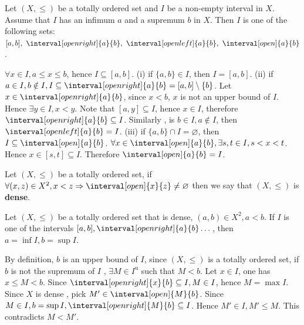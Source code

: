 \begin{propositionenv}
   Let $(X, \le )$ be a totally ordered set and $I $ be a  non-empty interval in $X$. Assume that $I$ has an infimum $a$ and a supremum $b$ in $X$. Then $I$ is one of the following sets:$[a, b], \ \interval[open right]{a}{b}, \ \interval[open left]{a}{b}, \ \interval[open]{a}{b}$.
\end{propositionenv}
\begin{proofenv}
    $\forall x\in I , a\le x\le b $, hence $I\subseteq [a, b]$.
    \newline
    (i) if $\{a, b\}\in I$,  then $I=[a, b]$.
    \newline
    (ii) if $a\in I,  b\notin I, I\subseteq\interval[open right]{a}{b}=[a, b]\setminus\{b\}$. Let $x\in \interval[open right]{a}{b}$,  since $x<b$,  $x$ is not an upper bound of $I$. Hence $\exists y\in I,  x<y$. Note that $[a, y]\subseteq I$,  hence $x\in I$,  therefore $\interval[open right]{a}{b}\subseteq I$. Similarly ,  is $b\in I, a\notin I$,  then $\interval[open left]{a}{b}=I$.
    \newline
    (iii) if $\{a, b\}\cap I=\varnothing$,  then $I\subseteq\interval[open]{a}{b}$. $\forall x\in \interval[open]{a}{b}, \exists s, t\in I, s<x<t$. Hence $x\in [s, t]\subseteq I$. Therefore $\interval[open]{a}{b}=I$.

\end{proofenv}
\begin{definitionenv}[Dense]
    Let $(X, \le )$ be a totally ordered set,  if $\forall (x, z)\in X^2, x<z\Rightarrow \interval[open]{x}{z}\not=\varnothing$ then we say that $(X, \le)$ is \textbf{dense}.
\end{definitionenv}
\begin{propositionenv}
    Let $(X, \le )$ be a totally ordered set that is dense,  $(a, b)\in X^2, a<b$. If $I$ is one of the intervals $[a, b], \interval[open right]{a}{b}\dots$,  then $a=\inf I, b=\sup I$.
\end{propositionenv}
\begin{proofenv}
    By definition,  $b$ is an upper bound of $I$,  since $(X, \le)$ is a totally ordered set, if $b$ is not the supremum of $I$ ,  $\exists M\in I^\mathrm{u}$ such that $M<b$.
    Let $x\in I$, one has $x\le M <b$. Since $\interval[open right]{x}{b}\subseteq I, M\in I$,  hence $M=\max I$. Since $X$ is dense , pick $M'\in \interval[open]{M}{b}$. Since $M\in I, b=\sup I, \interval[open right]{M}{b}\subseteq I$. Hence $M'\in I, M'\le M$. This contradicts $M<M'$.
\end{proofenv}


